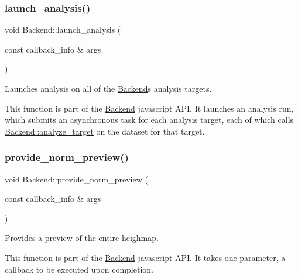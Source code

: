 \subsubsection{\texorpdfstring{launch\+\_\+analysis()}{launch\_analysis()}}
{\footnotesize\ttfamily void Backend\+::launch\+\_\+analysis (\begin{DoxyParamCaption}\item[{const callback\+\_\+info \&}]{args }\end{DoxyParamCaption})\hspace{0.3cm}{\ttfamily [static]}}



Launches analysis on all of the \hyperlink{class_backend}{Backend}\textquotesingle{}s analysis targets. 

This function is part of the \hyperlink{class_backend}{Backend} javascript A\+PI. It launches an analysis run, which submits an asynchronous task for each analysis target, each of which calls \hyperlink{class_backend_a149d05a4861bc09a73908f9817666586}{Backend\+::analyze\+\_\+target} on the dataset for that target. \mbox{\label{class_backend_a848c3f31e41690d5e27e0f260651ec9a}} 
\subsubsection{\texorpdfstring{provide\+\_\+norm\+\_\+preview()}{provide\_norm\_preview()}}
{\footnotesize\ttfamily void Backend\+::provide\+\_\+norm\+\_\+preview (\begin{DoxyParamCaption}\item[{const callback\+\_\+info \&}]{args }\end{DoxyParamCaption})\hspace{0.3cm}{\ttfamily [static]}}



Provides a preview of the entire heighmap. 

This function is part of the \hyperlink{class_backend}{Backend} javascript A\+PI. It takes one parameter, a callback to be executed upon completion. \mbox{\label{class_backend_abe8afa9fcd0ae0564b27c306bd35948d}} 
